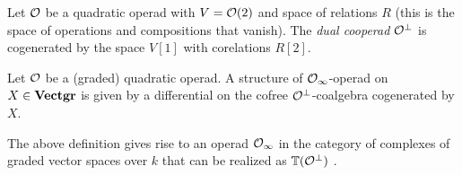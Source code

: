 \documentclass[TFM.tex]{subfiles}
\begin{document}
\begin{defi}
Let ${\mathcal O}$ be a quadratic operad with $V={\mathcal O}(2)$ and space of relations $R$ (this is the space of operations and compositions that vanish). The \emph{dual cooperad} ${\mathcal O}^{\perp}$ is cogenerated by the space $V[1]$ with corelations $R[2]$.
\end{defi}


\begin{defi}
Let ${\mathcal O}$ be a (graded) quadratic operad. A structure of ${\mathcal O}_\infty$-operad on $X\in\mathrm{\mathbf{Vectgr}}$ is given by a differential on the cofree ${\mathcal O}^\perp$-coalgebra cogenerated by $X$.
\end{defi}

The above definition gives rise to an operad ${\mathcal O}_\infty$ in the category of complexes of graded vector spaces over $k$ that can be realized as $\mathbb{T}({\mathcal O}^\perp)$ \cite{Hinich}. 
\end{document}
